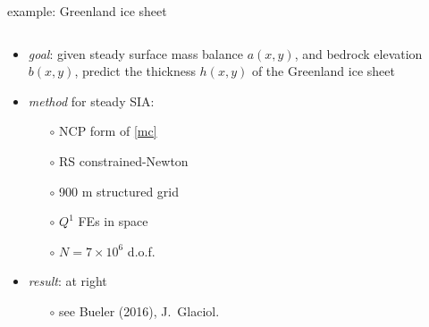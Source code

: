 \documentclass[xcolor={dvipsnames}]{beamer}
\begin{document}
\begin{frame}{example: Greenland ice sheet}

\begin{columns}
\begin{column}{0.6\textwidth}
\begin{itemize}
\item \emph{goal}: given steady surface mass balance $a(x,y)$, and bedrock elevation $b(x,y)$, predict the thickness $h(x,y)$ of the Greenland ice sheet

\medskip
\item \emph{method} for steady SIA:
  \begin{itemize}
  \item[$\circ$] NCP form of \eqref{mc}
  \item[$\circ$] RS constrained-Newton
  \item[$\circ$] 900 m structured grid
  \item[$\circ$] $Q^1$ FEs in space
  \item[$\circ$] $N=7\times 10^6$ d.o.f.
  \end{itemize}

\medskip
\item \emph{result}: at right
  \begin{itemize}
  \item[$\circ$] see Bueler (2016), J.~Glaciol.
  \end{itemize}
\end{itemize}
\end{column}
\begin{column}{0.4\textwidth}
\vspace{-5mm}


\end{column}
\end{columns}
\end{frame}
\end{document}
